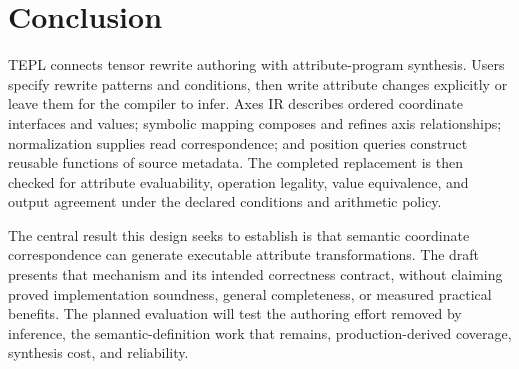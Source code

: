 \FloatBarrier
\section{Conclusion}
\label{sec:conclusion}
TEPL connects tensor rewrite authoring with attribute-program synthesis.
Users specify rewrite patterns and conditions, then write attribute changes
explicitly or leave them for the compiler to infer. Axes IR describes ordered
coordinate interfaces and values; symbolic mapping composes and refines axis
relationships; normalization supplies read correspondence; and position queries
construct reusable functions of source metadata. The completed replacement
is then checked for attribute evaluability, operation legality, value
equivalence, and output agreement under the declared conditions and arithmetic
policy.

The central result this design seeks to establish is that semantic coordinate
correspondence can generate executable attribute transformations. The draft
presents that mechanism and its intended correctness contract, without claiming
proved implementation soundness, general completeness, or measured practical
benefits. The planned evaluation will test the authoring effort removed by
inference, the semantic-definition work that remains, production-derived
coverage, synthesis cost, and reliability.
